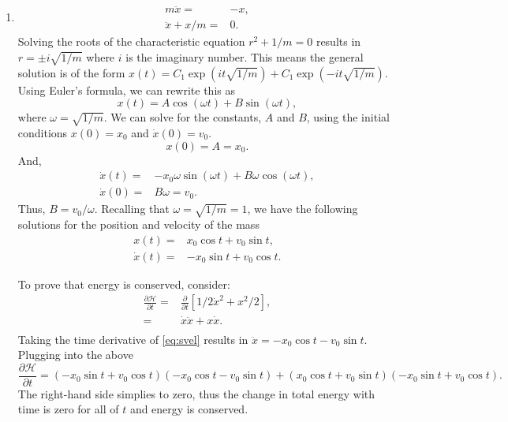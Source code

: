 \documentclass{article}
\begin{document}
\begin{enumerate}[label=\alph*)]
   \item \begin{align*}
       m\ddot{x} = & -x, \\
       \ddot{x} + x / m = & 0.
    \end{align*}
    Solving the roots of the characteristic equation $r^2 + 1/m = 0$ results in $r = \pm i \sqrt{1 / m}$ where $i$ is the imaginary number.
    This means the general solution is of the form $x(t) = C_1 \exp \left(i t \sqrt{1 / m} \right) + C_1 \exp \left(-i t \sqrt{1 / m} \right)$.
    Using Euler's formula, we can rewrite this as
    \begin{equation}
      x(t) = A \cos\left(\omega t\right) + B \sin\left(\omega t\right),
    \end{equation}
    where $\omega = \sqrt{1 / m}$.
    We can solve for the constants, $A$ and $B$, using the initial conditions $x(0) = x_0$ and $\dot{x}(0) = v_0$.
    \begin{equation*}
      x(0) = A = x_0.
    \end{equation*}
    And,
    \begin{align*}
      \dot{x}(t) = & -x_0 \omega \sin(\omega t) + B \omega \cos(\omega t), \\
      \dot{x}(0) = & B \omega = v_0. 
    \end{align*}
    Thus, $B = v_0 / \omega$. 
    Recalling that $\omega = \sqrt{1 / m} = 1$, we have the following solutions for the position and velocity of the mass
    \begin{align}
      \label{eq:spos}
      x(t) = & x_0 \cos t + v_0 \sin t, \\ \label{eq:svel}
      \dot{x}(t) = & -x_0 \sin t + v_0 \cos t.
    \end{align}

    To prove that energy is conserved, consider:
    \begin{align*}
      \frac{\partial \mathcal{H}}{\partial t} = & \frac{\partial}{\partial t} \left[ 1/2 \dot{x}^2 + x^2 / 2 \right], \\
      = & \dot{x} \ddot{x} + x \dot{x}. \\
    \end{align*}
    Taking the time derivative of \eqref{eq:svel} results in $\ddot{x} = -x_0 \cos t - v_0 \sin t$.
    Plugging into the above
    \begin{equation*}
      \frac{\partial \mathcal{H}}{\partial t} = \left(-x_0 \sin t + v_0 \cos t\right)\left(-x_0 \cos t - v_0 \sin t\right) + \left(x_0 \cos t + v_0 \sin t\right) \left(-x_0 \sin t + v_0 \cos t\right).
    \end{equation*}
    The right-hand side simplies to zero, thus the change in total energy with time is zero for all of $t$ and energy is conserved. 


\end{enumerate}
\end{document}

